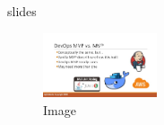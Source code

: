 \begin{frame}{slides}

\begin{figure}[htb]
	\centering
	\includegraphics[width=0.3\textwidth]{../img/devops-mvp.jpg}
	\caption{Image}
	\label{fig:onepoint}
\end{figure}

\end{frame}
